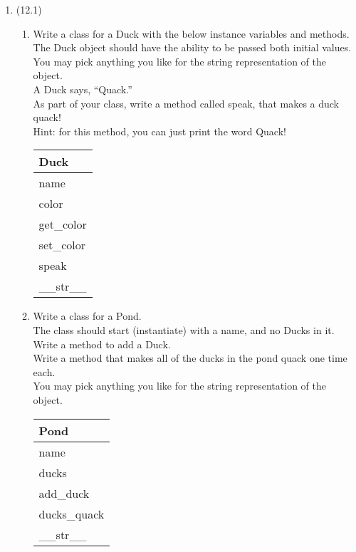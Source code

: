 \documentclass{article}
\begin{document}
\begin{enumerate}
\item (12.1)
	\begin{enumerate}
		\item
			Write a class for a Duck with the below instance variables and methods. \\ 
			The Duck object should have the ability to be passed both initial values.\\  
			You may pick anything you like for the string representation of the object.\\
			A Duck says, ``Quack.''\\  
			As part of your class, write a method called speak, that makes a duck quack!\\
			Hint: for this method, you can just print the word Quack!
			\begin{flushright}
			\begin{tabular}{|l|}
				\hline
				Duck\\ \hline
				name\\	color\\	 \hline
				get\_color \\ set\_color \\ speak \\ \_\_str\_\_ \\ \hline
			\end{tabular}
			\end{flushright}

		\item
			Write a class for a Pond. \\
			The class should start (instantiate) with a name, and no Ducks in it. \\ 
			Write a method to add a Duck.\\
			Write a method that makes all of the ducks in the pond quack one time each.\\
			You may pick anything you like for the string representation of the object.
	
			\begin{flushright}
			\begin{tabular}{|l|}
				\hline
				Pond\\ \hline  	%
				name\\ ducks\\ \hline		%
				add\_duck\\ ducks\_quack \\ \_\_str\_\_ \\ \hline		%
			\end{tabular}
			\end{flushright}


\end{enumerate}
\end{enumerate}
\end{document}
